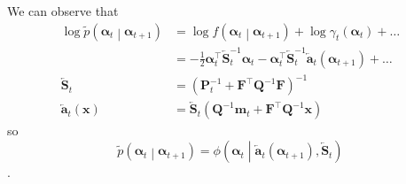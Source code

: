 \documentclass[notitlepage]{article}
\renewcommand{\vec}[1]{\bm{#1}}
\newcommand{\vecLarrow}[1]{\overleftarrow{\vec{#1}}}
\newcommand{\mat}[1]{\mathbf{#1}}
\newcommand{\matLarrow}[1]{\overleftarrow{\mat{#1}}}
\newcommand{\Lparen}[1]{\left( #1\right)}
\newcommand{\Cond}[2]{ #1 \middle\vert  #2}
\newcommand{\optor}[2]{#1\Lparen{#2}}
\newcommand{\optorC}[3]{\optor{#1}{\Cond{#2}{#3}}}
\newcommand{\pdenstC}[2]{\optorC{\widetilde p}{#1}{#2}}
\newcommand{\normaldC}[3]{\optorC{\phi}{#1}{#2,#3}}
\begin{document}
We can observe that %
%
\begin{align*}
\log\pdenstC{\vec{\alpha}_t}{\vec{\alpha}_{t + 1}} &=  
	\log \optorC{f}{\vec\alpha_t}{\vec\alpha_{t + 1}}
	+ \log \gamma_t(\vec\alpha_t) + \dots \\
	&= -\frac 12\vec\alpha_t^\top\matLarrow{S}_t^{-1}
	\vec\alpha_t - \vec\alpha_t^\top\matLarrow{S}_t^{-1}
	\vecLarrow{a}_t(\vec\alpha_{t+1})
	+ \dots \\
\matLarrow{S}_t  &= \Lparen{\mat P^{-1}_t + \mat F^\top\mat Q^{-1}\mat F}^{-1} \\
\vecLarrow{a}_t(\vec x) &= 
	\matLarrow{S}_t\Lparen{\mat Q^{-1}\vec m_t + \mat F^\top \mat Q^{-1}\vec x}
\end{align*}
%
so %
%
\begin{equation}\label{eqn:bwTransProp}
\pdenstC{\vec{\alpha}_t}{\vec{\alpha}_{t + 1}} = %
\normaldC{\vec\alpha_t}{\vecLarrow{a}_t(\vec{\alpha}_{t + 1})}%
{\matLarrow{S}_t}
\end{equation}. 
\end{document}
